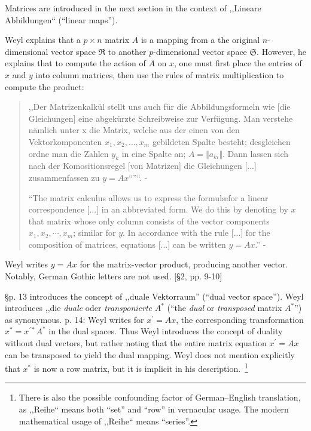 Matrices are introduced in the next section in the context of ,,Lineare Abbildungen``
(``linear maps'').

Weyl explains that a $p \times n$ matrix $A$ is a mapping from a the original
$n$-dimensional vector space $\mathfrak R$ to another $p$-dimensional vector space
$\mathfrak S$. However, he explains that to compute the action of $A$ on $x$, one
must first place the entries of $x$ and $y$ into column matrices, then use the
rules of matrix multiplication to compute the product:

\begin{quote}
,,Der Matrizenkalkül stellt uns auch für die Abbildungsformeln wie [die Gleichungen]
 eine abgekürzte Schreibweise zur Verfügung. Man verstehe nämlich unter x die Matrix, welche aus der einen von den Vektorkomponenten $x_1, x_2, \dots, x_m$ gebildeten Spalte besteht; desgleichen ordne man die Zahlen $y_k$ in eine Spalte an; $A = \Vert a_{ki} \Vert$. Dann lassen sich nach der Komositionsregel [von Matrizen] die Gleichungen [...] zusammenfassen zu $y = Ax$``''``. - \cite[p. 10]{Weyl1928}

``The matrix calculus allows us to express the formul\ae for
a linear correspondence [...] in an abbreviated form.
We do this by denoting by $x$ that matrix whose only column consists of the
vector components $x_1, x_2, \cdots, x_m$; similar
for $y$. In accordance with the rule [...] for the composition of
matrices, equations [...] can be written $y = Ax$.'' - \cite[p. 8]{Weyl1931}
\end{quote}

Weyl writes $y = A x$ for the matrix-vector product, producing another vector.
Notably, German Gothic letters are not used. [\S 2, pp. 9-10]

\S p. 13 introduces the concept of ,,duale Vektorraum'' (``dual vector space'').
Weyl introduces ,,die \textit{duale} oder \textit{transponierte} $A^*$
(``the \textit{dual} or \textit{transposed} matrix $A^*$'')
as synonymous.
p. 14: Weyl writes for $x^\prime = A x$, the corresponding transformation $x^* = x^{\prime *} A^*$
in the dual spaces.
Thus Weyl introduces the concept of duality without dual vectors, but rather noting
that the entire matrix equation $x^\prime = A x$ can be transposed to yield the
dual mapping. Weyl does not mention explicitly that $x^*$ is now a row matrix, but it is
implicit in his description.~\footnote{There is also the possible confounding
factor of German--English translation, as ,,Reihe`` means both ``set'' and ``row''
in vernacular usage. The modern mathematical usage of ,,Reihe`` means ``series''.}

